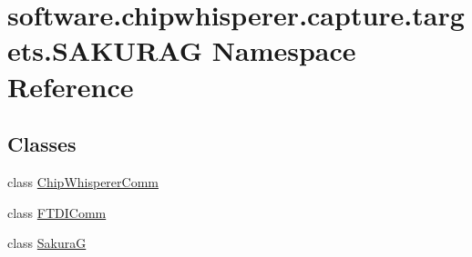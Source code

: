 \hypertarget{namespacesoftware_1_1chipwhisperer_1_1capture_1_1targets_1_1SAKURAG}{}\section{software.\+chipwhisperer.\+capture.\+targets.\+S\+A\+K\+U\+R\+A\+G Namespace Reference}
\label{namespacesoftware_1_1chipwhisperer_1_1capture_1_1targets_1_1SAKURAG}
\subsection*{Classes}
\begin{DoxyCompactItemize}
\item 
class \hyperlink{classsoftware_1_1chipwhisperer_1_1capture_1_1targets_1_1SAKURAG_1_1ChipWhispererComm}{Chip\+Whisperer\+Comm}
\item 
class \hyperlink{classsoftware_1_1chipwhisperer_1_1capture_1_1targets_1_1SAKURAG_1_1FTDIComm}{F\+T\+D\+I\+Comm}
\item 
class \hyperlink{classsoftware_1_1chipwhisperer_1_1capture_1_1targets_1_1SAKURAG_1_1SakuraG}{Sakura\+G}
\end{DoxyCompactItemize}
